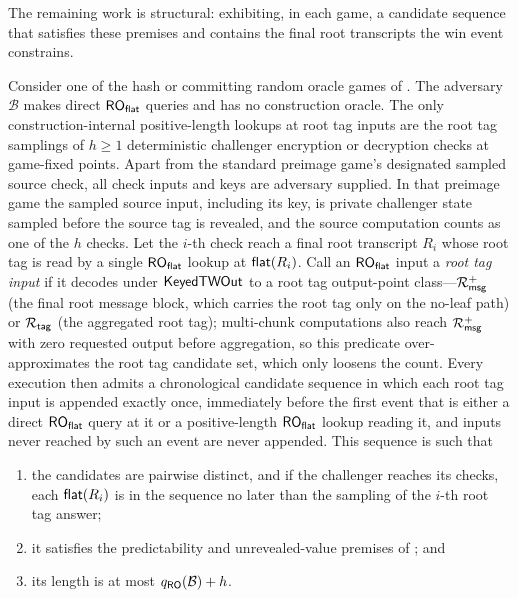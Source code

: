 The remaining work is structural: exhibiting, in each game, a candidate
sequence that satisfies these premises and contains the final root
transcripts the win event constrains.

\begin{lemma}
\label{lem:root-candidate-seq}
Consider one of the hash or committing random oracle games of
. The adversary $\mathcal{B}$ makes direct
$\mathsf{RO}_{\mathsf{flat}}$ queries and has no construction oracle. The only
construction-internal positive-length lookups at root tag inputs are the
root tag samplings of $h \geq 1$ deterministic challenger encryption or
decryption checks at game-fixed points. Apart from the standard preimage
game's designated sampled source check, all check inputs and keys are
adversary supplied. In that preimage game the sampled source input,
including its key, is private challenger state sampled before the source
tag is revealed, and the source computation counts as one of the $h$
checks. Let the $i$-th check reach a final root transcript $R_i$ whose
root tag is read by a single $\mathsf{RO}_{\mathsf{flat}}$ lookup at $\mathsf{flat}(R_i)$. Call an
$\mathsf{RO}_{\mathsf{flat}}$ input a \emph{root tag input} if it decodes under
$\mathsf{KeyedTWOut}$ to a root tag output-point class---$\mathcal{R}_{\mathsf{msg}}^+$ (the final
root message block, which carries the root tag only on the no-leaf path)
or $\mathcal{R}_{\mathsf{tag}}$ (the aggregated root tag); multi-chunk computations also reach
$\mathcal{R}_{\mathsf{msg}}^+$ with zero requested output before aggregation, so this predicate
over-approximates the root tag candidate set, which only loosens the
count. Every execution
then admits a chronological candidate sequence in which each root tag
input is appended exactly once, immediately before the first event that is
either a direct $\mathsf{RO}_{\mathsf{flat}}$ query at it or a positive-length $\mathsf{RO}_{\mathsf{flat}}$
lookup reading it, and inputs never reached by such an event are never
appended. This sequence is such that
\begin{enumerate}
\item the candidates are pairwise distinct, and if the challenger reaches
  its checks, each $\mathsf{flat}(R_i)$ is in the sequence no later than the
  sampling of the $i$-th root tag answer;
\item it satisfies the predictability and unrevealed-value premises of
  ; and
\item its length is at most $q_{\mathsf{RO}}(\mathcal{B}) + h$.
\end{enumerate}
\end{lemma}


